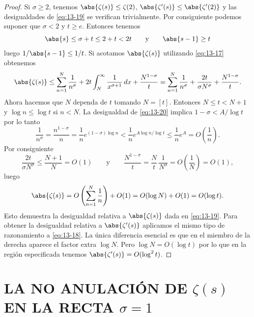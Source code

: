     \begin{proof}
        Si $\sigma\geq2$, tenemos $\abs{\zeta(s)}\leq\zeta(2)$, $\abs{\zeta'(s)}\leq\abs{\zeta'(2)}$
        y las desigualdades de \eqref{eq:13-19} se verifican trivialmente. Por consiguiente
        podemos suponer que $\sigma<2$ y $t\geq e$. Entonces tenemos
        \begin{equation*}
            \abs{s}\leq\sigma+t\leq2+t<2t\qquad\text{y}\qquad\abs{s-1}\geq t
        \end{equation*}
        luego $1/\abs{s-1}\leq1/t$. Si acotamos $\abs{\zeta(s)}$ utilizando \eqref{eq:13-17}
        obtenemos
        \begin{equation*}
            \abs{\zeta(s)}\leq\sum_{n=1}^{N}\frac{1}{n^{\sigma}}+2t\int_N^{\infty}\frac{1}{x^{\sigma+1}}\,dx+\frac{N^{1-\sigma}}{t}=\sum_{n=1}^{N}\frac{1}{n^{\sigma}}+\frac{2t}{\sigma N^{\sigma}}+\frac{N^{1-\sigma}}{t}.
        \end{equation*}
        Ahora hacemos que $N$ dependa de $t$ tomando $N=[t]$. Entonces $N\leq t<N+1$ y
        $\log n\leq\log t$ si $n<N$. La desigualdad de \eqref{eq:13-20} implica
        $1-\sigma<A/\log t$ por lo tanto
        \begin{equation*}
            \frac{1}{n^{\sigma}}=\frac{n^{1-\sigma}}{n}=\frac{1}{n}e^{(1-\sigma)\log n}<\frac{1}{n}e^{A\log n/\log t}\leq\frac{1}{n}e^A=O\left(\frac{1}{n}\right).
        \end{equation*}
        Por consiguiente
        \begin{equation*}
            \frac{2t}{\sigma N^{\sigma}}\leq\frac{N+1}{N}=O(1)\qquad\text{y}\qquad\frac{N^{1-\sigma}}{t}=\frac{N}{t}\,\frac{1}{N^{\sigma}}=O\left(\frac{1}{N}\right)=O(1),
        \end{equation*}
        luego
        \begin{equation*}
            \abs{\zeta(s)}=O\left(\sum_{n=1}^{N}\frac{1}{n}\right)+O(1)=O(\log N)+O(1)=O(\log t).
        \end{equation*}
        Esto demuestra la desigualdad relativa a $\abs{\zeta(s)}$ dada en \eqref{eq:13-19}. Para
        obtener la desigualdad relativa a $\abs{\zeta'(s)}$ aplicamos el mismo tipo de
        razonamiento a \eqref{eq:13-18}. La única diferencia esencial es que en el miembro de
        la derecha aparece el factor extra $\log N$. Pero $\log N=O(\log t)$ por lo que en la
        región especificada tenemos $\abs{\zeta'(s)}=O(\log^2t)$.
    \end{proof}

    \section{LA NO ANULACIÓN DE \texorpdfstring{$\zeta(s)$}{ζ(s)} EN LA RECTA \texorpdfstring{$\sigma=1$}{σ=1}}

